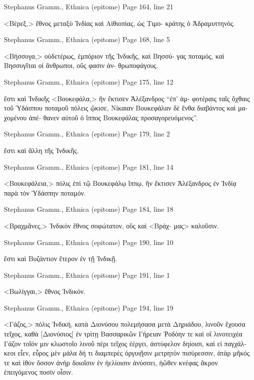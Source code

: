 \documentclass[12pt,letterpaper,twoside,final]{memoir}
\begin{document}
\begin{greek}
Stephanus Gramm., Ethnica (epitome) 
Page 164, line 21

<Βέρεξ,> ἔθνος μεταξὺ Ἰνδίας καὶ Αἰθιοπίας, ὡς Τιμο-
κράτης ὁ Ἀδραμυττηνός. 



Stephanus Gramm., Ethnica (epitome) 
Page 168, line 5

<Βήσσυγα,> οὐδετέρως, ἐμπόριον τῆς Ἰνδικῆς, καὶ Βησσύ-
γας ποταμός, καὶ Βησσυγῖται οἱ ἄνθρωποι, οὕς φασιν ἀν-
θρωποφάγους. 



Stephanus Gramm., Ethnica (epitome) 
Page 175, line 12

                                                                ἔστι 
καὶ Ἰνδικῆς <Βουκεφάλα,> ἣν ἔκτισεν Ἀλέξανδρος “ἐπ' ἀμ-
φοτέραις ταῖς ὄχθαις τοῦ Ὑδάσπου ποταμοῦ πόλεις ᾤκισε, 
Νίκαιαν Βουκεφάλαν δὲ ἔνθα διαβάντος καὶ μαχομένου ἀπέ-
θανεν αὐτοῦ ὁ ἵππος Βουκεφάλας προσαγορευόμενος”. 



Stephanus Gramm., Ethnica (epitome) 
Page 179, line 2

                            ἔστι καὶ ἄλλη τῆς Ἰνδικῆς. 



Stephanus Gramm., Ethnica (epitome) 
Page 181, line 14

<Βουκεφάλεια,> πόλις ἐπὶ τῷ Βουκεφάλῳ ἵππῳ, ἣν 
ἔκτισεν Ἀλέξανδρος ἐν Ἰνδίᾳ παρὰ τὸν Ὑδάσπην ποταμόν. 



Stephanus Gramm., Ethnica (epitome) 
Page 184, line 18

<Βραχμᾶνες,> Ἰνδικὸν ἔθνος σοφώτατον, οὓς καὶ <Βράχ-
μας> καλοῦσιν. 



Stephanus Gramm., Ethnica (epitome) 
Page 190, line 10

                ἔστι καὶ Βυζάντιον ἕτερον ἐν τῇ Ἰνδικῇ. 



Stephanus Gramm., Ethnica (epitome) 
Page 191, line 1

<Βωλίγγαι,> ἔθνος Ἰνδικόν. 



Stephanus Gramm., Ethnica (epitome) 
Page 194, line 19

<Γάζος,> πόλις Ἰνδική, κατὰ Διονύσου πολεμήσασα μετὰ 
Δηριάδου, λινοῦν ἔχουσα τεῖχος, καθὰ [Διονύσιος] ἐν τρίτῃ 
Βασσαρικῶν 
  Γήρειαν Ῥοδόην τε καὶ οἳ λινοτειχέα Γάζον 
  τοῖόν μιν κλωστοῖο λινοῦ πέρι τεῖχος ἐέργει,   
  ἀστύφελον δηίοισι, καὶ εἰ παγχάλκεοι εἶεν, 
  εὖρος μὲν μάλα δή τι διαμπερὲς ὀργυιῇσιν 
  μετρητὸν πισύρεσσιν, ἀτὰρ μῆκός τε καὶ ἰθύν 
  ὅσσον ἀνὴρ δοιοῖσιν ἐν ἠελίοισιν ἀνύσσει, 
  ἠῶθεν κνέφας ἄκρον ἐπειγόμενος ποσὶν οἷσιν. 




\end{greek}
\end{document}
